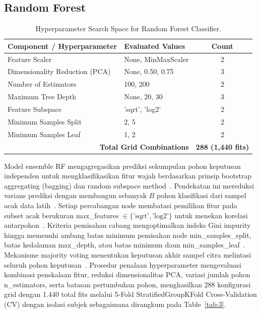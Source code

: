 \subsection{Random Forest}
\label{sec:random_forest}

\begin{table}[htbp]
\caption{Hyperparameter Search Space for Random Forest Classifier.}
\label{tab:3}
\label{tab:III}
\label{tab:rf_params}
\centering
\footnotesize
\begin{tabular}{llc}
\toprule
Component / Hyperparameter & Evaluated Values & Count \\
\midrule
Feature Scaler & None, MinMaxScaler & 2 \\
Dimensionality Reduction (PCA) & None, 0.50, 0.75 & 3 \\
Number of Estimators & 100, 200 & 2 \\
Maximum Tree Depth & None, 20, 30 & 3 \\
Feature Subspace & 'sqrt', 'log2' & 2 \\
Minimum Samples Split & 2, 5 & 2 \\
Minimum Samples Leaf & 1, 2 & 2 \\
\midrule
\multicolumn{2}{r}{\textbf{Total Grid Combinations}} & \textbf{288 (1,440 fits)} \\
\bottomrule
\end{tabular}
\end{table}

Model ensemble RF mengagregasikan prediksi sekumpulan pohon keputusan independen untuk mengklasifikasikan fitur wajah berdasarkan prinsip bootstrap aggregating (bagging) dan random subspace method~\cite{ref30}. Pendekatan ini mereduksi varians prediksi dengan membangun sebanyak $B$ pohon klasifikasi dari sampel acak data latih~\cite{ref31}. Setiap percabangan node membatasi pemilihan fitur pada subset acak berukuran max\_features $\in \{\text{'sqrt'}, \text{'log2'}\}$ untuk menekan korelasi antarpohon~\cite{ref32}. Kriteria pemisahan cabang mengoptimalkan indeks Gini impurity hingga memenuhi ambang batas minimum pemisahan node min\_samples\_split, batas kedalaman max\_depth, atau batas minimum daun min\_samples\_leaf~\cite{ref33}. Mekanisme majority voting menentukan keputusan akhir sampel citra melintasi seluruh pohon keputusan~\cite{ref34}. Prosedur penalaan hyperparameter mengevaluasi kombinasi penskalaan fitur, reduksi dimensionalitas PCA, variasi jumlah pohon n\_estimators, serta batasan pertumbuhan pohon, menghasilkan 288 konfigurasi grid dengan 1.440 total fits melalui 5-Fold StratifiedGroupKFold Cross-Validation (CV) dengan isolasi subjek sebagaimana dirangkum pada Table~\ref{tab:3}.
